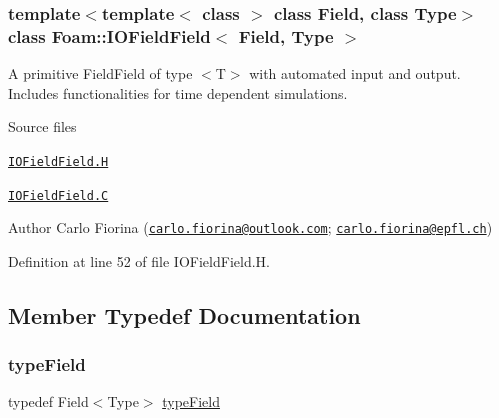 \subsubsection*{template$<$template$<$ class $>$ class Field, class Type$>$\newline
class Foam\+::\+I\+O\+Field\+Field$<$ Field, Type $>$}

A primitive Field\+Field of type $<$T$>$ with automated input and output. Includes functionalities for time dependent simulations. 

\label{_Description}%
 \begin{DoxyParagraph}{Source files}

\begin{DoxyItemize}
\item \href{../../../home/carlo/data/GeN-Foam/GeN-Foam_ffn/GeN-Foam/GeN-Foam/classes/thermalHydraulics/src/include/IOFieldField/IOFieldField.H}{\tt I\+O\+Field\+Field.\+H} 
\item \href{../../../home/carlo/data/GeN-Foam/GeN-Foam_ffn/GeN-Foam/GeN-Foam/classes/thermalHydraulics/src/include/IOFieldField/IOFieldField.C}{\tt I\+O\+Field\+Field.\+C} 
\end{DoxyItemize}Author Carlo Fiorina (\href{mailto:carlo.fiorina@outlook.com}{\tt carlo.\+fiorina@outlook.\+com}; \href{mailto:carlo.fiorina@epfl.ch}{\tt carlo.\+fiorina@epfl.\+ch}) 
\end{DoxyParagraph}


Definition at line 52 of file I\+O\+Field\+Field.\+H.



\subsection{Member Typedef Documentation}
\mbox{\label{classFoam_1_1IOFieldField_a0b5dcbf9bf55b122c23ceb80ebdd07df}} 
\subsubsection{\texorpdfstring{type\+Field}{typeField}}
{\footnotesize\ttfamily typedef Field$<$Type$>$ \hyperlink{classFoam_1_1IOFieldField_a0b5dcbf9bf55b122c23ceb80ebdd07df}{type\+Field}}



